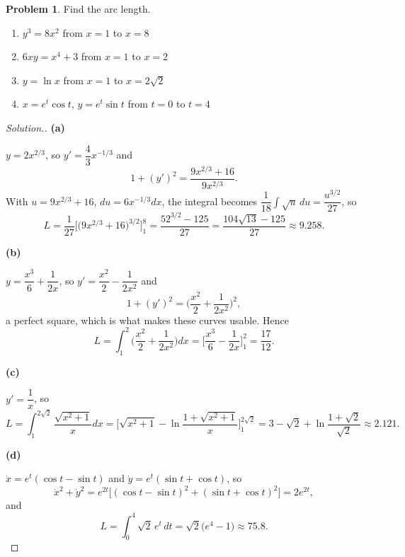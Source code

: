 \documentclass[11pt,a4paper]{article}
\theoremstyle{definition}
\newtheorem{problemx}{Problem}[subsection]
\newenvironment{problem}{\begin{problemx}}{\end{problemx}}
\newenvironment{solution}
  {\renewcommand{\qedsymbol}{}\begin{proof}[\textit{Solution}.]}
  {\end{proof}}
\newcommand{\subhead}[1]{%
  \par\medskip\noindent\textbf{#1}\par\nobreak\smallskip}
\begin{document}
\begin{problem}
Find the arc length.
\begin{enumerate}
\item[(a)] $y^3 = 8x^2$ from $x=1$ to $x=8$
\item[(b)] $6xy = x^4+3$ from $x=1$ to $x=2$
\item[(c)] $y = \ln x$ from $x=1$ to $x=2\sqrt2$
\item[(d)] $x = e^t\cos t$, $y = e^t\sin t$ from $t=0$ to $t=4$
\end{enumerate}
\end{problem}
\begin{solution}
\subhead{(a)} $y = 2x^{2/3}$, so $y' = \dfrac{4}{3}x^{-1/3}$ and
$$1 + (y')^2 = \frac{9x^{2/3}+16}{9x^{2/3}} .$$
With $u = 9x^{2/3}+16$, $du = 6x^{-1/3}dx$, the integral becomes
$\dfrac{1}{18}\displaystyle\int\sqrt u\,du = \dfrac{u^{3/2}}{27}$, so
$$L = \frac{1}{27}\Big[\big(9x^{2/3}+16\big)^{3/2}\Big]_1^8
= \frac{52^{3/2}-125}{27} = \frac{104\sqrt{13}-125}{27}\approx 9.258 .$$

\subhead{(b)} $y = \dfrac{x^3}{6} + \dfrac{1}{2x}$, so
$y' = \dfrac{x^2}{2} - \dfrac{1}{2x^2}$ and
$$1 + (y')^2 = \Big(\frac{x^2}{2} + \frac{1}{2x^2}\Big)^2 ,$$
a perfect square, which is what makes these curves usable. Hence
$$L = \int_1^2\Big(\frac{x^2}{2}+\frac{1}{2x^2}\Big)dx
= \Big[\frac{x^3}{6} - \frac{1}{2x}\Big]_1^2 = \frac{17}{12}.$$

\subhead{(c)} $y' = \dfrac1x$, so
$$L = \int_1^{2\sqrt2}\frac{\sqrt{x^2+1}}{x}dx
= \Big[\sqrt{x^2+1} - \ln\frac{1+\sqrt{x^2+1}}{x}\Big]_1^{2\sqrt2}
= 3 - \sqrt2 + \ln\frac{1+\sqrt2}{\sqrt2}\approx 2.121 .$$

\subhead{(d)} $\dot x = e^t(\cos t - \sin t)$ and
$\dot y = e^t(\sin t + \cos t)$, so
$$\dot x^2 + \dot y^2 = e^{2t}\Big[(\cos t-\sin t)^2 + (\sin t+\cos t)^2\Big]
= 2e^{2t},$$
and
$$L = \int_0^4\sqrt2\,e^t\,dt = \sqrt2\big(e^4-1\big)\approx 75.8 .$$
\end{solution}
\end{document}
